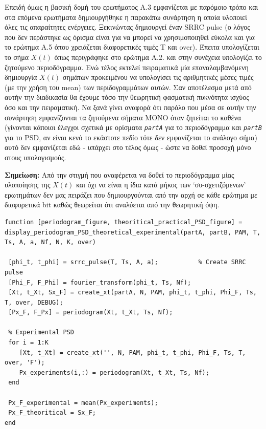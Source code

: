 \documentclass[11pt]{article}
\begin{document}
    \par \noindent
    Επειδή όμως η βασική δομή του ερωτήματος Α.3 εμφανίζεται με παρόμοιο τρόπο και στα επόμενα ερωτήματα δημιουργήθηκε η παρακάτω συνάρτηση η οποία υλοποιεί όλες τις απαραίτητες ενέργειες. 
    Ξεκινώντας δημιουργεί έναν SRRC pulse (ο λόγος που δεν περάστηκε ως όρισμα είναι για να μπορεί να χρησιμοποιηθεί εύκολα και για το ερώτημα Α.5 όπου χρειάζεται διαφορετικές τιμές Τ και over).
    Έπειτα υπολογίζεται το σήμα $X(t)$ όπως περιγράφηκε στο ερώτημα Α.2. και στην συνέχεια υπολογίζει το ζητούμενο περιοδόγραμμα. 
    Ενώ τέλος εκτελεί πειραματικά μία επαναλαμβανόμενη δημιουργία $X(t)$ σημάτων προκειμένου να υπολογίσει τις αριθμητικές μέσες τιμές (με την χρήση του mean) των περιδογραμμάτων αυτών. 
    Σαν αποτέλεσμα μετά από αυτήν την διαδικασία θα έχουμε τόσο την θεωρητική φασματική πυκνότητα ισχύος όσο και την πειραματική.  
    Να ξανά γίνει αναφορά ότι παρόλο που μέσα σε αυτήν την συνάρτηση εμφανίζονται τα ζητούμενα σήματα ΜΟΝΟ όταν ζητείται το καθένα (γίνονται κάποιοι έλεγχοι σχετικά με ορίσματα \emph{\texttt{partA}} για το περιοδόγραμμα και \emph{\texttt{partΒ}} για το PSD, αν είναι κενό το εκάστοτε πεδίο τότε δεν εμφανίζεται το ανάλογο σήμα) αυτό δεν εμφανίζεται εδώ - υπάρχει στο τέλος όμως - ώστε να δοθεί προσοχή μόνο στους υπολογισμούς.
    \par \noindent
    \textbf{Σημείωση:} Από την στιγμή που αναφέρεται να δοθεί το περιοδόγραμμα μίας υλοποίησης της $X(t)$ και όχι να είναι η ίδια κατά μήκος των `συ-σχετιζόμενων' ερωτημάτων δεν μας πειράζει που δημιουργούνται από την αρχή σε κάθε ερώτημα με διαφορετικά bit καθώς θεωρείται ότι αναλύεται από την θεωρητική όψη.
    
    
    \begin{lstlisting}[caption = {\texttt{display\_periodogram\_PSD\_theoretical\_experimental.m}}]
function [periodogram_figure, theoritical_practical_PSD_figure] = display_periodogram_PSD_theoretical_experimental(partA, partB, PAM, T, Ts, A, a, Nf, N, K, over)
    
 [phi_t, t_phi] = srrc_pulse(T, Ts, A, a);           % Create SRRC pulse  
 [Phi_F, F_Phi] = fourier_transform(phi_t, Ts, Nf);
 [Xt, t_Xt, Sx_F] = create_xt(partA, N, PAM, phi_t, t_phi, Phi_F, Ts, T, over, DEBUG);
 [Px_F, F_Px] = periodogram(Xt, t_Xt, Ts, Nf);
    
 % Experimental PSD 
 for i = 1:K                                            
    [Xt, t_Xt] = create_xt('', N, PAM, phi_t, t_phi, Phi_F, Ts, T, over, 'F');
    Px_experiments(i,:) = periodogram(Xt, t_Xt, Ts, Nf);
 end
    
 Px_F_experimental = mean(Px_experiments);           
 Px_F_theoritical = Sx_F;                        	
end
    \end{lstlisting}
    
\end{document}
